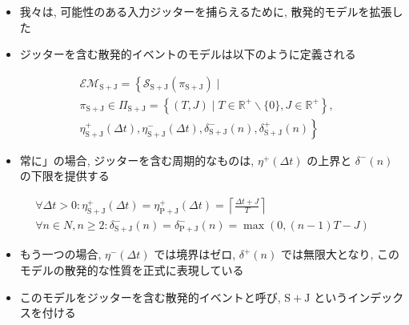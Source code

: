 \begin{frame}{}
    \begin{itemize}
        \item 我々は, 可能性のある入力ジッターを捕らえるために, 散発的モデルを拡張した
        \item ジッターを含む散発的イベントのモデルは以下のように定義される

    \end{itemize}
    \begin{equation*}
        \begin{aligned}
             & \mathcal{E} \mathcal{M}_{\mathrm{S}+\mathrm{J}}=\left\{\mathcal{S}_{\mathrm{S}+\mathrm{J}}\left(\pi_{\mathrm{S}+\mathrm{J}}\right) \mid\right. \\
             & \pi_{\mathrm{S}+\mathrm{J}} \in \Pi_{\mathrm{S}+\mathrm{J}}=\left\{(T, J) \mid T \in \mathbb{R}^{+} \backslash\{0\}, J \in \mathbb{R}^{+}\right\},                                 \\
             & \left.\eta_{\mathrm{S}+\mathrm{J}}^{+}(\Delta t), \eta_{\mathrm{S}+\mathrm{J}}^{-}(\Delta t), \delta_{\mathrm{S}+\mathrm{J}}^{-}(n), \delta_{\mathrm{S}+\mathrm{J}}^{+}(n)\right\}
        \end{aligned}
    \end{equation*}
\end{frame}

\begin{frame}{}
    \begin{itemize}
        \item 常に」の場合, ジッターを含む周期的なものは, $\eta^{+}(\Delta t)$ の上界と $\delta^{-}(n)$ の下限を提供する

    \end{itemize}
    \begin{equation*}
        \begin{array}{r}
            \forall \Delta t>0: \eta_{\mathrm{S}+\mathrm{J}}^{+}(\Delta t)=\eta_{\mathrm{P}+\mathrm{J}}^{+}(\Delta t)=\left\lceil\frac{\Delta t+J}{T}\right\rceil \\
            \forall n \in N, n \geq 2: \delta_{\mathrm{S}+\mathrm{J}}^{-}(n)=\delta_{\mathrm{P}+\mathrm{J}}^{-}(n)=\max (0,(n-1) T-J)
        \end{array}
    \end{equation*}
\end{frame}

\begin{frame}{}
    \begin{itemize}
        \item もう一つの場合, $\eta^{-}(\Delta t)$ では境界はゼロ, $\delta^{+}(n)$ では無限大となり, このモデルの散発的な性質を正式に表現している
        \item このモデルをジッターを含む散発的イベントと呼び, $\mathrm{S}+\mathrm{J}$ というインデックスを付ける
    \end{itemize}
\end{frame}

